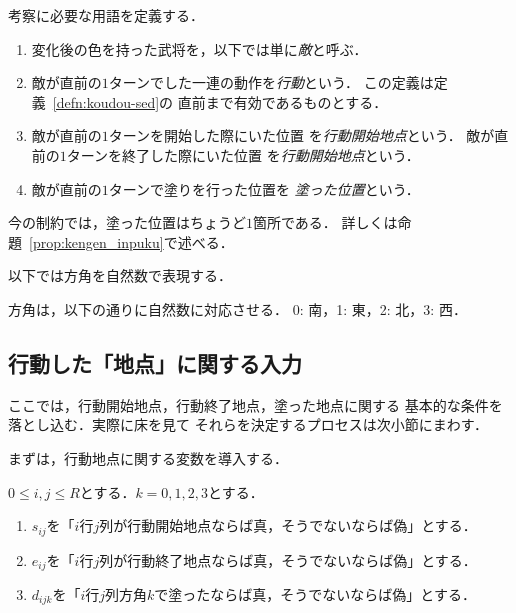考察に必要な用語を定義する．

\begin{defn}
 \begin{enumerate}
  \item 変化後の色を持った武将を，以下では単に\emph{敵}と呼ぶ．
  \item 敵が直前の$1$ターンでした一連の動作を\emph{行動}という．
        この定義は定義~\ref{defn:koudou-sed}の
        直前まで有効であるものとする．
  \item 敵が直前の$1$ターンを開始した際にいた位置
        を\emph{行動開始地点}という．
        敵が直前の$1$ターンを終了した際にいた位置
        を\emph{行動開始地点}という．
  \item 敵が直前の$1$ターンで塗りを行った位置を
        \emph{塗った位置}という．
 \end{enumerate}
\end{defn}

今の制約では，塗った位置はちょうど$1$箇所である．
詳しくは命題~\ref{prop:kengen_inpuku}で述べる．

以下では方角を自然数で表現する．

\begin{rem}
 方角は，以下の通りに自然数に対応させる．
 0: 南，1: 東，2: 北，3: 西．
\end{rem}

\subsection{行動した「地点」に関する入力} \label{subsec:chiten}

ここでは，行動開始地点，行動終了地点，塗った地点に関する
基本的な条件を落とし込む．実際に床を見て
それらを決定するプロセスは次小節にまわす．

まずは，行動地点に関する変数を導入する．

\begin{nota}
 $0 \leq i, j \leq R$とする．$k = 0, 1, 2 ,3$とする．
 \begin{enumerate}[1.]
  \item $s_{ij}$を「$i$行$j$列が行動開始地点ならば真，そうでないならば偽」とする．
  \item $e_{ij}$を「$i$行$j$列が行動終了地点ならば真，そうでないならば偽」とする．
  \item $d_{ijk}$を「$i$行$j$列方角$k$で塗ったならば真，そうでないならば偽」とする．
 \end{enumerate}
\end{nota}

